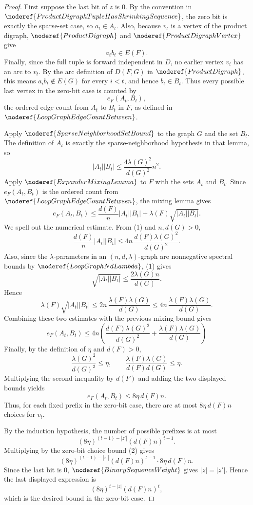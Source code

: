 \begin{proof}
First suppose the last bit of \(z\) is \(0\). By the convention in \(\noderef{ProductDigraphTupleHasShrinkingSequence}\), the zero bit is exactly the sparse-set case, so \(a_t\in A_t\). Also, because \(v_t\) is a vertex of the product digraph, \(\noderef{ProductDigraph}\) and \(\noderef{ProductDigraphVertex}\) give
\[
  a_t b_t\in E(F).
\]
Finally, since the full tuple is forward independent in \(D\), no earlier vertex \(v_i\) has an arc to \(v_t\). By the arc definition of \(D(F,G)\) in \(\noderef{ProductDigraph}\), this means \(a_i b_t\notin E(G)\) for every \(i<t\), and hence \(b_t\in B_t\). Thus every possible last vertex in the zero-bit case is counted by
\[
  e_F(A_t,B_t),
\]
the ordered edge count from \(A_t\) to \(B_t\) in \(F\), as defined in \(\noderef{LoopGraphEdgeCountBetween}\).

Apply \(\noderef{SparseNeighborhoodSetBound}\) to the graph \(G\) and the set \(B_t\). The definition of \(A_t\) is exactly the sparse-neighborhood hypothesis in that lemma, so
\[
  |A_t||B_t|\le \frac{4\lambda(G)^2}{d(G)^2}n^2. \tag{1}
\]
Apply \(\noderef{ExpanderMixingLemma}\) to \(F\) with the sets \(A_t\) and \(B_t\). Since \(e_F(A_t,B_t)\) is the ordered count from \(\noderef{LoopGraphEdgeCountBetween}\), the mixing lemma gives
\[
  e_F(A_t,B_t)
  \le \frac{d(F)}{n}|A_t||B_t|
      +\lambda(F)\sqrt{|A_t||B_t|}.
\]
We spell out the numerical estimate. From (1) and \(n,d(G)>0\),
\[
  \frac{d(F)}{n}|A_t||B_t|
  \le 4n\,\frac{d(F)\lambda(G)^2}{d(G)^2}.
\]
Also, since the \(\lambda\)-parameters in an \((n,d,\lambda)\)-graph are nonnegative spectral bounds by \(\noderef{LoopGraphNdLambda}\), (1) gives
\[
  \sqrt{|A_t||B_t|}\le \frac{2\lambda(G)n}{d(G)}.
\]
Hence
\[
  \lambda(F)\sqrt{|A_t||B_t|}
  \le 2n\,\frac{\lambda(F)\lambda(G)}{d(G)}
  \le 4n\,\frac{\lambda(F)\lambda(G)}{d(G)}.
\]
Combining these two estimates with the previous mixing bound gives
\[
  e_F(A_t,B_t)
  \le 4n\left(\frac{d(F)\lambda(G)^2}{d(G)^2}
        +\frac{\lambda(F)\lambda(G)}{d(G)}\right)
\]
Finally, by the definition of \(\eta\) and \(d(F)>0\),
\[
  \frac{\lambda(G)^2}{d(G)^2}\le \eta,
  \qquad
  \frac{\lambda(F)\lambda(G)}{d(F)d(G)}\le \eta.
\]
Multiplying the second inequality by \(d(F)\) and adding the two displayed bounds yields
\[
  e_F(A_t,B_t)\le 8\eta\, d(F)n. \tag{2}
\]
Thus, for each fixed prefix in the zero-bit case, there are at most \(8\eta\,d(F)n\) choices for \(v_t\).

By the induction hypothesis, the number of possible prefixes is at most
\[
  (8\eta)^{(t-1)-|z'|}(d(F)n)^{t-1}.
\]
Multiplying by the zero-bit choice bound (2) gives
\[
  (8\eta)^{(t-1)-|z'|}(d(F)n)^{t-1}
  \cdot 8\eta\,d(F)n.
\]
Since the last bit is \(0\), \(\noderef{BinarySequenceWeight}\) gives \(|z|=|z'|\). Hence the last displayed expression is
\[
  (8\eta)^{t-|z|}(d(F)n)^t,
\]
which is the desired bound in the zero-bit case.


\end{proof}
